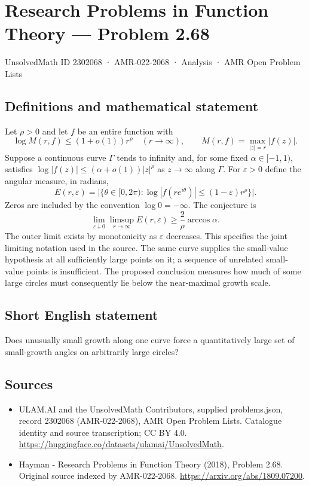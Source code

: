 \documentclass[11pt,a4paper]{article}
\begin{document}
\section*{Research Problems in Function Theory — Problem 2.68}\label{2302068}
{\small UnsolvedMath ID 2302068 · AMR-022-2068 · Analysis · AMR Open Problem Lists}
\subsection{Definitions and mathematical statement}
Let $\rho>0$ and let $f$ be an entire function with
\[
\log M(r,f)\le(1+o(1))r^\rho\quad(r\to\infty),
\qquad M(r,f)=\max_{|z|=r}|f(z)|.
\]
Suppose a continuous curve $\Gamma$ tends to infinity and, for some fixed $\alpha\in[-1,1)$, satisfies
$\log|f(z)|\le(\alpha+o(1))|z|^\rho$ as $z\to\infty$ along $\Gamma$.
For $\varepsilon>0$ define the angular measure, in radians,
\[
E(r,\varepsilon)=\bigl|\{\theta\in[0,2\pi):
\log|f(re^{i\theta})|\le(1-\varepsilon)r^\rho\}\bigr|.
\]
Zeros are included by the convention $\log0=-\infty$. The conjecture is
\[
\lim_{\varepsilon\downarrow0}\limsup_{r\to\infty}E(r,\varepsilon)
\ge \frac2\rho\arccos\alpha.
\]
The outer limit exists by monotonicity as $\varepsilon$ decreases. This specifies the joint limiting notation used in the source. The same curve supplies the small-value hypothesis at all sufficiently large points on it; a sequence of unrelated small-value points is insufficient. The proposed conclusion measures how much of some large circles must consequently lie below the near-maximal growth scale.
\subsection{Short English statement}
Does unusually small growth along one curve force a quantitatively large set of small-growth angles on arbitrarily large circles?
\subsection{Sources}
\begin{itemize}
\item[S1] ULAM.AI and the UnsolvedMath Contributors, supplied problems.json, record 2302068 (AMR-022-2068), AMR Open Problem Lists. Catalogue identity and source transcription; CC BY 4.0.
\url{https://huggingface.co/datasets/ulamai/UnsolvedMath}.
\item[S2] Hayman - Research Problems in Function Theory (2018), Problem 2.68. Original source indexed by AMR-022-2068.
\url{https://arxiv.org/abs/1809.07200}.
\end{itemize}
\end{document}

